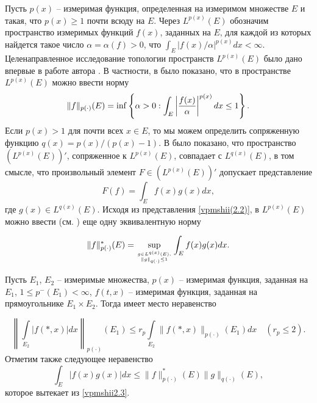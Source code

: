 Пусть $p(x)$ -- измеримая функция, определенная на измеримом множестве $E$ и такая, что $p(x)\ge1$ почти всюду на $E$. Через $L^{p(x)}(E)$ обозначим пространство измеримых функций $f(x)$, заданных на $E$, для каждой из  которых найдется такое число $\alpha=\alpha(f)>0$, что $\int_E|f(x)/\alpha|^{p(x)}dx<\infty$.  Целенаправленное исследование топологии пространств $L^{p(x)}(E)$  было дано впервые в работе автора
\cite{vpmshiiShar4}. В частности, в \cite{vpmshiiShar4} было показано, что в пространстве $L^{p(x)}(E)$ можно ввести норму
\begin{equation}\label{vpmshii2.1}
    \|f\|_{p(\cdot)}(E)=\inf \left\{\alpha>0:   \int_E\left|{f(x)\over\alpha}\right|^{p(x)}dx\le1\right\}.
\end{equation}
Если $p(x)>1$ для почти всех $x\in E$, то мы можем определить сопряженную функцию $q(x)=p(x)/(p(x)-1)$. В \cite{vpmshiiShar4} было показано, что пространство $(L^{p(x)}(E))'$, сопряженное к   $L^{p(x)}(E)$, совпадает с $L^{q(x)}(E)$,  в том смысле, что произвольный элемент $F\in(L^{p(x)}(E))' $ допускает представление
\begin{equation}\label{vpmshii(2.2)}
    F(f)=\int_E f(x)g(x)dx,
\end{equation}
где $g(x)\in L^{q(x)}(E)$. Исходя из представления \eqref{vpmshii(2.2)},  в $L^{p(x)}(E)$ можно ввести (см.\cite{shiimonog} ) еще одну эквивалентную норму

\begin{equation}\label{vpmshii2.3}
    \|f \|^*_{p(\cdot)}(E)=\sup_{g\in L^{q(x)}(E),\atop \|g\|_{q(\cdot)}\le1}\int_E f(x)g(x)dx.
\end{equation}

 Пусть $E_1$, $E_2$ -- измеримые множества,
$p(x)$ -- измеримая функция, заданная на $E_1$, $1\le
p^-(E_1)<\infty$, $f(t,x)$ -- измеримая функция, заданная на
прямоугольнике $E_1\times E_2$. Тогда имеет место \cite{vpmshiiShar6} неравенство

\begin{equation}\label{vpmshii2.4}
    \left\|\int\limits_{E_2}|f(*,x)|dx\right\|_{p(\cdot)}(E_1)\le
r_p \int\limits_{E_2}\|f(*,x)\|_{p(\cdot)}(E_1)dx\quad
(r_p\le2).
\end{equation}
Отметим также следующее неравенство
\begin{equation}\label{vpmshii2.5}
    \int_E |f(x)g(x)|dx\le \|f \|^*_{p(\cdot)}(E)\|g\|_{q(\cdot)}(E),
\end{equation}
которое вытекает из \eqref{vpmshii2.3}.




